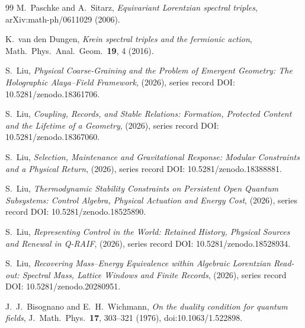 \documentclass[12pt]{article}
\theoremstyle{definition}
\theoremstyle{remark}
\begin{document}
\begin{thebibliography}{99}
M.~Paschke and A.~Sitarz, \emph{Equivariant Lorentzian spectral triples}, arXiv:math-ph/0611029 (2006).

K.~van den Dungen, \emph{Krein spectral triples and the fermionic action}, Math.\ Phys.\ Anal.\ Geom.\ \textbf{19}, 4 (2016).

S.~Liu, \emph{Physical Coarse-Graining and the Problem of Emergent Geometry: The Holographic Alaya--Field Framework}, (2026), series record DOI: 10.5281/zenodo.18361706.

S.~Liu, \emph{Coupling, Records, and Stable Relations: Formation, Protected Content and the Lifetime of a Geometry}, (2026), series record DOI: 10.5281/zenodo.18367060.

S.~Liu, \emph{Selection, Maintenance and Gravitational Response: Modular Constraints and a Physical Return}, (2026), series record DOI: 10.5281/zenodo.18388881.

S.~Liu, \emph{Thermodynamic Stability Constraints on Persistent Open Quantum Subsystems: Control Algebra, Physical Actuation and Energy Cost}, (2026), series record DOI: 10.5281/zenodo.18525890.

S.~Liu, \emph{Representing Control in the World: Retained History, Physical Sources and Renewal in Q-RAIF}, (2026), series record DOI: 10.5281/zenodo.18528934.

S.~Liu, \emph{Recovering Mass--Energy Equivalence within Algebraic Lorentzian Read-out: Spectral Mass, Lattice Windows and Finite Records}, (2026), series record DOI: 10.5281/zenodo.20280951.

J.~J.~Bisognano and E.~H.~Wichmann, \emph{On the duality condition for quantum fields}, J.\ Math.\ Phys.\ \textbf{17}, 303--321 (1976), doi:10.1063/1.522898.

\end{thebibliography}
\end{document}
